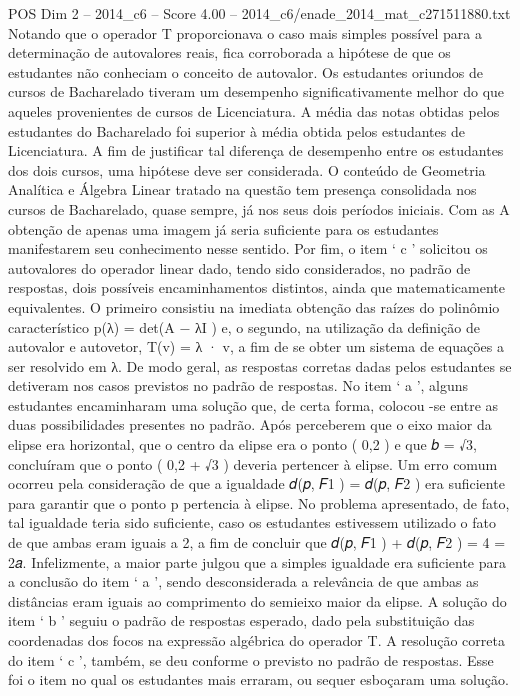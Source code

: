 \begin{textsample}{POS Dim 2 – 2014\_c6 – Score 4.00 – 2014\_c6/enade\_2014\_mat\_c271511880.txt}
Notando que o operador T proporcionava o caso mais simples possível para a determinação de autovalores reais, fica corroborada a hipótese de que os estudantes não conheciam o conceito de autovalor.
Os estudantes oriundos de cursos de Bacharelado tiveram um desempenho significativamente melhor do que aqueles provenientes de cursos de Licenciatura.
A média das notas obtidas pelos estudantes do Bacharelado foi superior à média obtida pelos estudantes de Licenciatura.
A fim de justificar tal diferença de desempenho entre os estudantes dos dois cursos, uma hipótese deve ser considerada.
O conteúdo de Geometria Analítica e Álgebra Linear tratado na questão tem presença consolidada nos cursos de Bacharelado, quase sempre, já nos seus dois períodos iniciais.
Com as A obtenção de apenas uma imagem já seria suficiente para os estudantes manifestarem seu conhecimento nesse sentido.
Por fim, o item ‘ c ’ solicitou os autovalores do operador linear dado, tendo sido considerados, no padrão de respostas, dois possíveis encaminhamentos distintos, ainda que matematicamente equivalentes.
O primeiro consistiu na imediata obtenção das raízes do polinômio característico p(λ) = det(A − λI ) e, o segundo, na utilização da definição de autovalor e autovetor, T(v) = λ · v, a fim de se obter um sistema de equações a ser resolvido em λ.
De modo geral, as respostas corretas dadas pelos estudantes se detiveram nos casos previstos no padrão de respostas.
No item ‘ a ’, alguns estudantes encaminharam uma solução que, de certa forma, colocou -se entre as duas possibilidades presentes no padrão.
Após perceberem que o eixo maior da elipse era horizontal, que o centro da elipse era o ponto ( 0,2 ) e que 𝑏 = √3, concluíram que o ponto ( 0,2 + √3 ) deveria pertencer à elipse.
Um erro comum ocorreu pela consideração de que a igualdade 𝑑(𝑝, 𝐹1 ) = 𝑑(𝑝, 𝐹2 ) era suficiente para garantir que o ponto p pertencia à elipse.
No problema apresentado, de fato, tal igualdade teria sido suficiente, caso os estudantes estivessem utilizado o fato de que ambas eram iguais a 2, a fim de concluir que 𝑑(𝑝, 𝐹1 ) + 𝑑(𝑝, 𝐹2 ) = 4 = 2𝑎.
Infelizmente, a maior parte julgou que a simples igualdade era suficiente para a conclusão do item ‘ a ’, sendo desconsiderada a relevância de que ambas as distâncias eram iguais ao comprimento do semieixo maior da elipse.
A solução do item ‘ b ’ seguiu o padrão de respostas esperado, dado pela substituição das coordenadas dos focos na expressão algébrica do operador T.
A resolução correta do item ‘ c ’, também, se deu conforme o previsto no padrão de respostas.
Esse foi o item no qual os estudantes mais erraram, ou sequer esboçaram uma solução.

\end{textsample}
